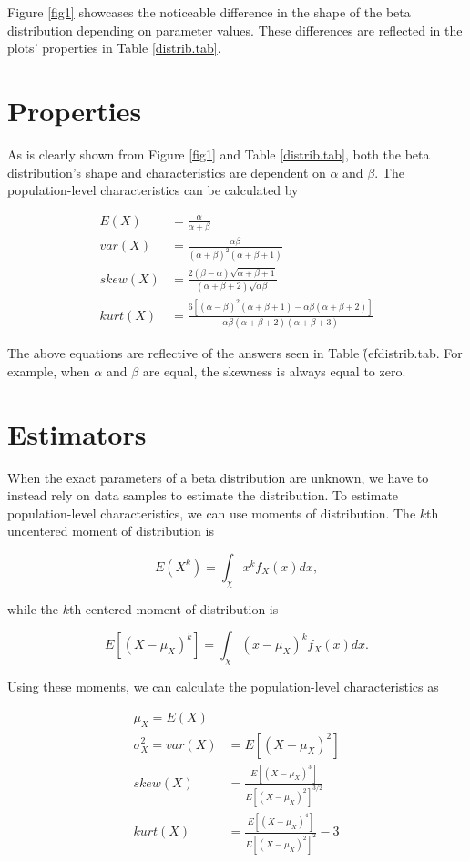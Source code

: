 \documentclass{article}\usepackage[]{graphicx}\usepackage[]{xcolor}
\begin{document}
\begin{multicols}{2}
Figure \ref{fig1} showcases the noticeable difference in the shape of the beta distribution depending on parameter values. These differences are reflected in the plots' properties in Table \ref{distrib.tab}. 


\section{Properties}
As is clearly shown from Figure \ref{fig1} and Table \ref{distrib.tab}, both the beta distribution's shape and characteristics are dependent on $\alpha$ and $\beta$. The population-level characteristics can be calculated by

\begin{align*}
E(X) &= \frac{\alpha}{\alpha + \beta} \tag{The Mean} \\
var(X) &= \frac{\alpha\beta}{(\alpha + \beta)^2(\alpha + \beta + 1)} \tag{The variance} \\
skew(X) &= \frac{2(\beta-\alpha)\sqrt{\alpha + \beta + 1}}{(\alpha + \beta + 2)\sqrt{\alpha\beta}} \tag{The Skewness} \\
kurt(X) &= \frac{6[(\alpha-\beta)^2(\alpha+\beta+1)-\alpha\beta(\alpha+\beta+2)]}{\alpha\beta(\alpha+\beta+2)(\alpha+\beta+3)} \tag{The Excess Kurtosis}
\end{align*}

The above equations are reflective of the answers seen in Table \r(ef{distrib.tab}. For example, when $\alpha$ and $\beta$ are equal, the skewness is always equal to zero.

\section{Estimators}
When the exact parameters of a beta distribution are unknown, we have to instead rely on data samples to estimate the distribution. To estimate population-level characteristics, we can use moments of distribution. The $k$th uncentered moment of distribution is 

\[E(X^k) = \int_\chi x^kf_X(x)dx,\]

while the $k$th centered moment of distribution is

\[E[(X-\mu_X)^k] = \int_\chi (x-\mu_X)^kf_X(x)dx.\]

Using these moments, we can calculate the population-level characteristics as

\begin{align*}
\mu_X = E(X) & \tag{The Mean} \\ 
\sigma^2_X = var(X) &= E[(X-\mu_X)^2] \tag{The Variance} \\
skew(X) &= \frac{E[(X-\mu_X)^3]}{E[(X-\mu_X)^2]^{3/2}} \tag{The Skewness} \\
kurt(X) &= \frac{E[(X-\mu_X)^4]}{E[(X-\mu_X)^2]^2}-3 \tag{The Excess Kurtosis}
\end{align*}


\end{multicols}
\end{document}
